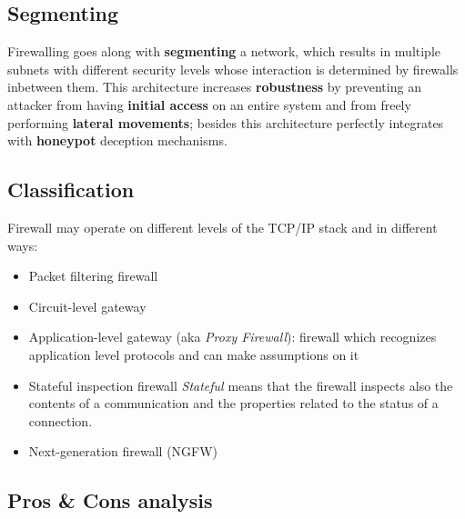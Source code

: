 \subsection{Segmenting}
Firewalling goes along with \textbf{segmenting} a network,
which results in multiple subnets with different security levels whose interaction is determined by firewalls inbetween them.
This architecture increases \textbf{robustness} by preventing an attacker from having \textbf{initial access} on an entire system and from freely performing \textbf{lateral movements};
besides this architecture perfectly integrates with \textbf{honeypot} deception mechanisms.

\subsection{Classification}
Firewall may operate on different levels of the TCP/IP stack and in different ways:
\begin{itemize}
   \item Packet filtering firewall
   \item Circuit-level gateway
   \item Application-level gateway (aka \textit{Proxy Firewall}):
   firewall which recognizes application level protocols and can make assumptions on it
   \item Stateful inspection firewall
   \textit{Stateful} means that the firewall inspects also the contents of a communication and the properties related to the status of a connection.
   \item Next-generation firewall (NGFW)
\end{itemize} 



\subsection{Pros \& Cons analysis}

